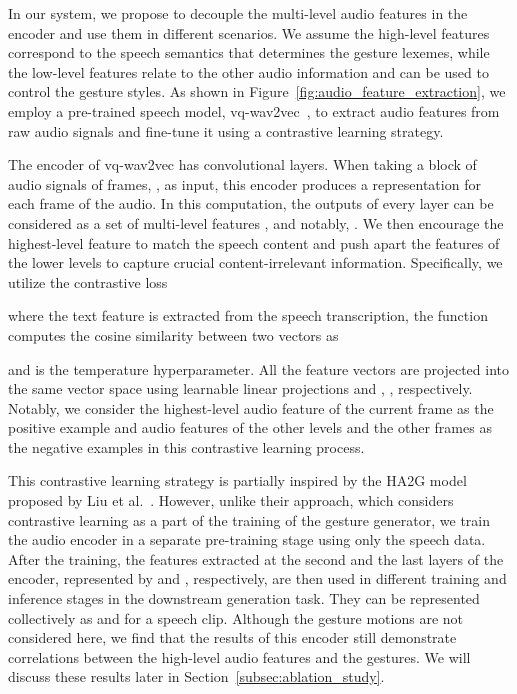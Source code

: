 \documentclass[acmtog,authorversion]{acmart}
\newcommand{\fig}{Figure{}~}
\begin{document}
In our system, we propose to decouple the multi-level audio features in the encoder and use them in different scenarios. We assume the high-level features correspond to the speech semantics that determines the gesture lexemes, while the low-level features relate to the other audio information and can be used to control the {gesture styles}. As shown in \fig\ref{fig:audio_feature_extraction}, we employ a pre-trained speech model, {vq-wav2vec}~\cite{baevski2020vq-wav2vec}, to extract audio features from raw audio signals and fine-tune it using a contrastive learning strategy.

The encoder of vq-wav2vec has  convolutional layers. When taking a block of audio signals of  frames, , as input, this encoder produces a representation  for each frame  of the audio. In this computation, the outputs of every layer can be considered as a set of multi-level features , and notably, . We then encourage the highest-level feature  to match the speech content and push apart the features of the lower levels  to capture crucial content-irrelevant information. Specifically, we utilize the contrastive loss

where the text feature  is extracted from the speech transcription, the  function computes the cosine similarity between two vectors as

and  is the temperature hyperparameter. All the feature vectors are projected into the same vector space using learnable linear projections  and , , respectively. Notably, we consider the highest-level audio feature of the current frame as the positive example and audio features of the other levels and the other frames as the negative examples in this contrastive learning process.

This contrastive learning strategy is partially inspired by the HA2G model proposed by Liu et al.~. However, unlike their approach, which considers contrastive learning as a part of the training of the gesture generator, we train the audio encoder in a separate pre-training stage using only the speech data. After the training, the features extracted at the second and the last layers of the encoder, represented by  and , respectively, are then used in different training and inference stages in the downstream generation task. They can be represented collectively as  and  for a speech clip. Although the gesture motions are not considered here, we find that the results of this encoder still demonstrate correlations between the high-level audio features and the gestures. We will discuss these results later in Section~\ref{subsec:ablation_study}.
\end{document}
